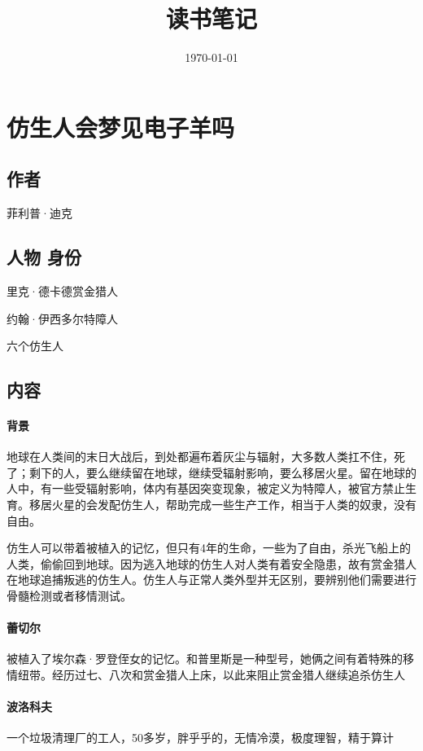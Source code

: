 \documentclass[a4paper]{ctexart}
\title{读书笔记}
\date{\today}
\begin{document}
	\maketitle		%
	\tableofcontents	%
	\newpage

\section{仿生人会梦见电子羊吗}
	\subsection{作者}
	{\kaishu 菲利普·迪克}
	\subsection{人物 身份}
	里克·德卡德\quad \quad 赏金猎人
	
	约翰·伊西多尔\quad \quad 特障人
	
	六个仿生人
	\subsection{内容}

		\paragraph{背景}
	
	地球在人类间的末日大战后，到处都遍布着灰尘与辐射，大多数人类扛不住，死了；剩下的人，要么继续留在地球，继续受辐射影响，要么移居火星。留在地球的人中，有一些受辐射影响，体内有基因突变现象，被定义为特障人，被官方禁止生育。移居火星的会发配仿生人，帮助完成一些生产工作，相当于人类的奴隶，没有自由。

	仿生人可以带着被植入的记忆，但只有4年的生命，一些为了自由，杀光飞船上的人类，偷偷回到地球。因为逃入地球的仿生人对人类有着安全隐患，故有赏金猎人在地球追捕叛逃的仿生人。仿生人与正常人类外型并无区别，要辨别他们需要进行骨髓检测或者移情测试。	
	
		\paragraph{蕾切尔}
		被植入了埃尔森·罗登侄女的记忆。和普里斯是一种型号，她俩之间有着特殊的移情纽带。经历过七、八次和赏金猎人上床，以此来阻止赏金猎人继续追杀仿生人
		
		\paragraph{波洛科夫}
		一个垃圾清理厂的工人，50多岁，胖乎乎的，无情冷漠，极度理智，精于算计
	
\end{document}
